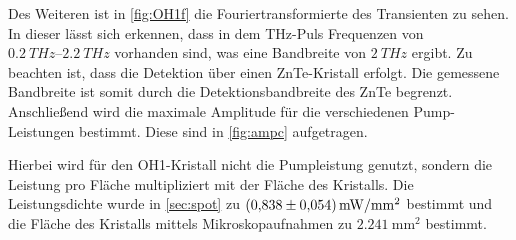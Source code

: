 Des Weiteren ist in \autoref{fig:OH1f} die Fouriertransformierte des Transienten zu sehen. 
In dieser lässt sich erkennen, dass in dem THz-Puls Frequenzen von $\SIrange{0.2}{2.2}{THz}$ vorhanden sind, 
was eine Bandbreite von $\SI{2}{THz}$ ergibt. 
Zu beachten ist, dass die Detektion über einen ZnTe-Kristall erfolgt. 
Die gemessene Bandbreite ist somit durch die Detektionsbandbreite des ZnTe begrenzt.
Anschließend wird die maximale Amplitude für die verschiedenen Pump-Leistungen bestimmt. Diese sind 
in \autoref{fig:ampc} aufgetragen. 




Hierbei wird für den OH1-Kristall nicht die Pumpleistung genutzt, sondern die Leistung pro Fläche multipliziert mit der Fläche des 
Kristalls. 
Die Leistungsdichte wurde in \autoref{sec:spot} zu $\SI{0.838+-0.054}{\milli\watt\per\milli\meter\squared}$ bestimmt und die Fläche des
Kristalls mittels Mikroskopaufnahmen zu $\SI{2.241}{\milli\meter\squared}$ bestimmt. 


